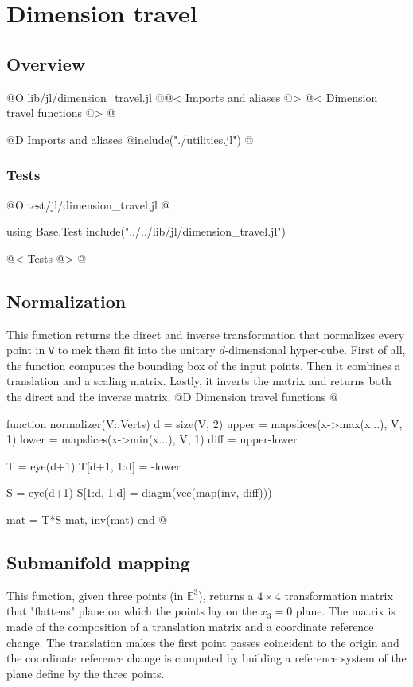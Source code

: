 
\chapter{Dimension travel}

\section{Overview}
@O lib/jl/dimension_travel.jl
@{@< Imports and aliases @>
@< Dimension travel functions @>
@}

@D Imports and aliases
@{include("./utilities.jl")
@}
\subsection{Tests}
@O test/jl/dimension_travel.jl
@{using Base.Test
include("../../lib/jl/dimension_travel.jl")

@< Tests @>
@}


\section{Normalization}
This function returns the direct and inverse transformation that
normalizes every point in \texttt{V} to mek them fit into the unitary
$d$-dimensional hyper-cube.
First of all, the function computes the bounding box of the input points.
Then it combines a translation and a scaling matrix. Lastly, it
inverts the matrix and returns both the direct and the inverse matrix.
@D Dimension travel functions
@{function normalizer(V::Verts)
    d = size(V, 2)
    upper = mapslices(x->max(x...), V, 1)
    lower = mapslices(x->min(x...), V, 1)
    diff = upper-lower

    T = eye(d+1)
    T[d+1, 1:d] = -lower

    S = eye(d+1)
    S[1:d, 1:d] = diagm(vec(map(inv, diff)))

    mat = T*S
    mat, inv(mat)
end
@}


\section{Submanifold mapping}

This function, given three points (in $\mathbb{E}^3$), 
returns a $4\times4$ transformation matrix that "flattens"
plane on which the points lay on the $x_3=0$ plane. 
The matrix is made of the composition of
a translation matrix and a coordinate reference change. The translation
makes the first point passes coincident to the origin and
the coordinate reference change is computed by building a reference
system of the plane define by the three points.

